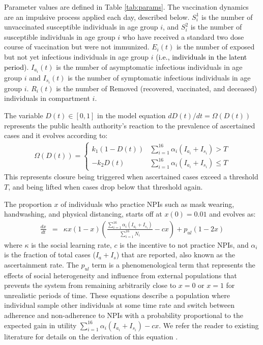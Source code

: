 \documentclass[10pt,onecolumn,twoside,lineno]{pnas-new}
\begin{document}
\noindent Parameter values are defined in Table \ref{tab:params}. The vaccination dynamics are an impulsive process applied each day, described below. $S^{1}_i$ is the number of unvaccinated susceptible individuals in age group $i$, and $S^{2}_i$ is the number of susceptible individuals in age group $i$ who have received a standard two dose course of vaccination but were not immunized. $E_i(t)$ is the number of exposed but not yet infectious individuals in age group $i$ (\textcolor{black}{i.e., individuals in the latent period}). $I_{a_i}(t)$ is the number of asymptomatic infectious individuals in age group $i$ and $I_{s_i}(t)$ is the number of symptomatic infectious individuals in age group $i$. $R_i(t)$ is the number of Removed (recovered, vaccinated, and deceased) individuals in compartment $i$.

The variable $D(t) \in [0,1]$ in the model equation $dD(t)/dt = \Omega(D(t))$ represents the public health authority's reaction to the prevalence of ascertained cases and it evolves according to: 
\begin{eqnarray}
  \Omega(D(t)) =  \left\{
\begin{array}{ll}
    k_1 (1 - D(t)) &  \sum_{i=1}^{16}\alpha_i(I_{a_i} + I_{s_i}) > T\\
    - k_2 D(t) & \sum_{i=1}^{16}\alpha_i(I_{a_i} + I_{s_i}) \leq T
\end{array} 
\right. 
\end{eqnarray}
This represents closure being triggered when ascertained cases exceed a threshold $T$, and being lifted when cases drop below that threshold again. 

The proportion $x$ of individuals who practice NPIs such as mask wearing, handwashing, and physical distancing, starts off at $x(0)=0.01$ and evolves as: 
\begin{eqnarray}
\frac{dx}{dt} &= &\kappa x (1-x) \left(\frac{\sum_{i=1}^{16}\alpha_i(I_{a_i} + I_{s_i})}{\sum_{i=1}^{16} N_i} - c x\right) + p_{ul}(1-2 x) 
\label{xeqn_new}
\end{eqnarray}
where $\kappa$ is the social learning rate, $c$ is the incentive to not practice NPIs, and $\alpha_i$ is the fraction of total cases ($I_a + I_s$) that are reported, also known as the ascertainment rate.  The $p_{ul}$ term is a phenomenological term that represents the effects of social heterogeneity and influence from external populations that prevents the system from remaining arbitrarily close to $x=0$ or $x=1$ for unrealistic periods of time.  These equations describe a population where individual sample other individuals at some time rate and switch between adherence and non-adherence to NPIs with a probability proportional to the expected gain in utility $\sum_{i=1}^{16}\alpha_i(I_{a_i} + I_{s_i}) - c x$. We refer the reader to existing literature for details on the derivation of this equation \cite{bauch2005imitation,innes2013impact,thampi2018socio,bauch2012evolutionary,oraby2014influence}. 
\end{document}
